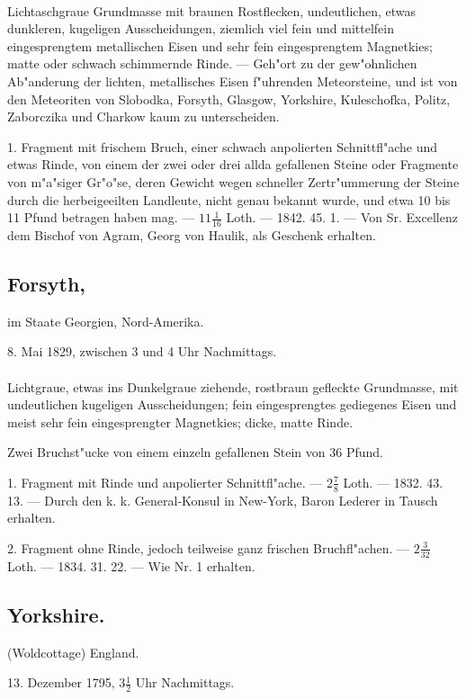 \documentclass[a4paper, 11pt, oneside, polutonikogreek, german]{article}
\begin{document}
\paragraph{}
Lichtaschgraue Grundmasse mit braunen Rostflecken, undeutlichen, etwas dunkleren, kugeligen Ausscheidungen, ziemlich viel fein und mittelfein eingesprengtem metallischen Eisen und sehr fein eingesprengtem Magnetkies; matte oder schwach schimmernde Rinde. --- Geh"ort zu der gew"ohnlichen Ab"anderung der lichten, metallisches Eisen f"uhrenden Meteorsteine, und ist von den Meteoriten von Slobodka, Forsyth, Glasgow, Yorkshire, Kuleschofka, Politz, Zaborczika und Charkow kaum zu unterscheiden.

1. Fragment mit frischem Bruch, einer schwach anpolierten Schnittfl"ache und etwas Rinde, von einem der zwei oder drei allda gefallenen Steine oder Fragmente von m"a"siger Gr"o"se, deren Gewicht wegen schneller Zertr"ummerung der Steine durch die herbeigeeilten Landleute, nicht genau bekannt wurde, und etwa 10 bis 11 Pfund betragen haben mag. --- $11\frac{1}{16}$ Loth. --- 1842. 45. 1. --- Von Sr. Excellenz dem Bischof von Agram, Georg von Haulik, als Geschenk erhalten.
\subsection[Forsyth.]{Forsyth,}
\begin{center}
\small
im Staate Georgien, Nord-Amerika.

8. Mai 1829, zwischen 3 und 4 Uhr Nachmittags.
\end{center}
\paragraph{}
Lichtgraue, etwas ins Dunkelgraue ziehende, rostbraun gefleckte Grundmasse, mit undeutlichen kugeligen Ausscheidungen; fein eingesprengtes gediegenes Eisen und meist sehr fein eingesprengter Magnetkies; dicke, matte Rinde.

Zwei Bruchst"ucke von einem einzeln gefallenen Stein von 36 Pfund.

1. Fragment mit Rinde und anpolierter Schnittfl"ache. --- $2\frac{7}{8}$ Loth. --- 1832. 43. 13. --- Durch den k. k. General-Konsul in New-York, Baron Lederer in Tausch erhalten.

2. Fragment ohne Rinde, jedoch teilweise ganz frischen Bruchfl"achen. --- $2\frac{3}{32}$ Loth. --- 1834. 31. 22. --- Wie Nr. 1 erhalten.
\subsection{Yorkshire.}
\begin{center}
\small
(Woldcottage) England.

13. Dezember 1795, $3\frac{1}{2}$ Uhr Nachmittags.
\end{center}
\end{document}
